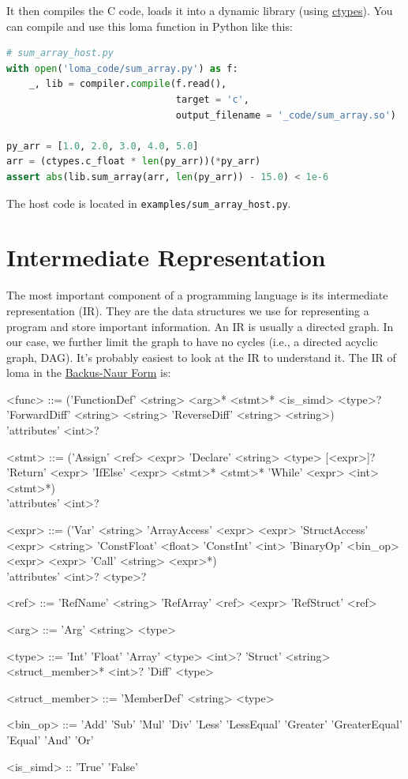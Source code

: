 It then compiles the C code, loads it into a dynamic library (using \href{https://docs.python.org/3/library/ctypes.html}{ctypes}). You can compile and use this loma function in Python like this:
\begin{lstlisting}[language=python]
# sum_array_host.py
with open('loma_code/sum_array.py') as f:
    _, lib = compiler.compile(f.read(),
                              target = 'c',
                              output_filename = '_code/sum_array.so')

py_arr = [1.0, 2.0, 3.0, 4.0, 5.0]
arr = (ctypes.c_float * len(py_arr))(*py_arr)
assert abs(lib.sum_array(arr, len(py_arr)) - 15.0) < 1e-6
\end{lstlisting}
The host code is located in \lstinline{examples/sum_array_host.py}.

\section{Intermediate Representation}
\label{sec:IR}

The most important component of a programming language is its intermediate representation (IR). They are the data structures we use for representing a program and store important information. An IR is usually a directed graph. In our case, we further limit the graph to have no cycles (i.e., a directed acyclic graph, DAG). It's probably easiest to look at the IR to understand it. 
The IR of loma in the \href{https://en.wikipedia.org/wiki/Backus%E2%80%93Naur_form}{Backus-Naur Form} is:
\begin{grammar}
<func> ::= ('FunctionDef' <string> <arg>* <stmt>* <is_simd> <type>?
\alt 'ForwardDiff' <string> <string>
\alt 'ReverseDiff' <string> <string>) \\
'attributes' <int>?

<stmt> ::= ('Assign' <ref> <expr>
\alt 'Declare' <string> <type> [<expr>]? 
\alt 'Return' <expr>
\alt 'IfElse' <expr> <stmt>* <stmt>*
\alt 'While' <expr> <int> <stmt>*) \\
'attributes' <int>?

<expr> ::= ('Var' <string>
\alt 'ArrayAccess' <expr> <expr>
\alt 'StructAccess' <expr> <string>
\alt 'ConstFloat' <float>
\alt 'ConstInt' <int>
\alt 'BinaryOp' <bin_op> <expr> <expr>
\alt 'Call' <string> <expr>*) \\
'attributes' <int>? <type>?

<ref> ::= 'RefName' <string>
\alt 'RefArray' <ref> <expr>
\alt 'RefStruct' <ref> 

<arg> ::= 'Arg' <string> <type>

<type> ::= 'Int'
\alt 'Float'
\alt 'Array' <type> <int>?
\alt 'Struct' <string> <struct_member>* <int>?
\alt 'Diff' <type>

<struct_member> ::= 'MemberDef' <string> <type>

<bin_op> ::= 'Add'
\alt 'Sub'
\alt 'Mul'
\alt 'Div'
\alt 'Less'
\alt 'LessEqual'
\alt 'Greater'
\alt 'GreaterEqual'
\alt 'Equal'
\alt 'And'
\alt 'Or'

<is_simd> :: 'True' \alt 'False'
\end{grammar}

